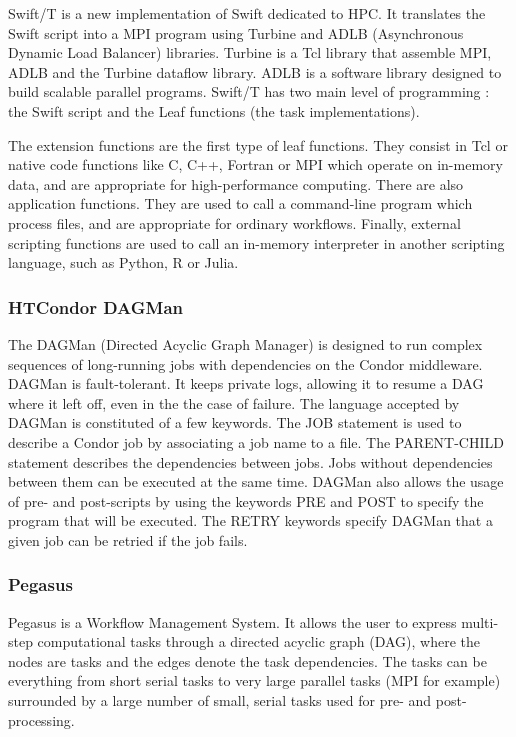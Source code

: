 Swift/T \cite{WAWKL2013} is a new implementation of Swift dedicated to HPC.
It translates the Swift script into a MPI program using Turbine \cite{WAMLK2012} and ADLB (Asynchronous Dynamic Load Balancer) \cite{LusPB2010} libraries.
Turbine is a Tcl library that assemble MPI, ADLB and the Turbine dataflow library.
ADLB is a software library designed to build scalable parallel programs.
Swift/T has two main level of programming : the Swift script and the Leaf functions (the task implementations).

The extension functions are the first type of leaf functions.
They consist in Tcl or native code functions like C, C++, Fortran or MPI which operate on in-memory data, and are appropriate for high-performance computing.
There are also application functions.
They are used to call a command-line program which process files, and are appropriate for ordinary workflows.
Finally, external scripting functions are used to call an in-memory interpreter in another scripting language, such as Python, R or Julia.

\subsubsection{HTCondor DAGMan}
The DAGMan (Directed Acyclic Graph Manager) \cite{ThaTL2005} is designed to run complex sequences of long-running jobs with dependencies on the Condor \cite{ThaTL2002} \cite{CKRWW2007} middleware.
DAGMan is fault-tolerant.
It keeps private logs, allowing it to resume a DAG where it left off, even in the the case of failure.
The language accepted by DAGMan is constituted of a few keywords.
The JOB statement is used to describe a Condor job by associating a job name to a file.
The PARENT-CHILD statement describes the dependencies between jobs.
Jobs without dependencies between them can be executed at the same time.
DAGMan also allows the usage of pre- and post-scripts by using the keywords PRE and POST to specify the program that will be executed.
The RETRY keywords specify DAGMan that a given job can be retried if the job fails.

\subsubsection{Pegasus}
Pegasus \cite{DSSBG2005} is a Workflow Management System.
It allows the user to express multi-step computational tasks through a directed acyclic graph (DAG), where the nodes are tasks and the edges denote the task dependencies.
The tasks can be everything  from short serial tasks to very large parallel tasks (MPI for example) surrounded by a large number of small, serial tasks used for pre- and post-processing.

